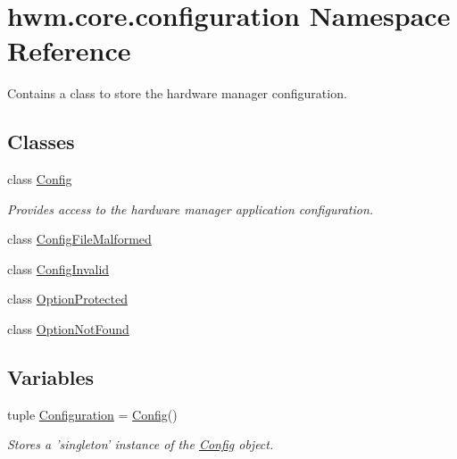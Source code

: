\hypertarget{namespacehwm_1_1core_1_1configuration}{\section{hwm.\-core.\-configuration Namespace Reference}
\label{namespacehwm_1_1core_1_1configuration}
}


Contains a class to store the hardware manager configuration.  


\subsection*{Classes}
\begin{DoxyCompactItemize}
\item 
class \hyperlink{classhwm_1_1core_1_1configuration_1_1_config}{Config}
\begin{DoxyCompactList}\small\item\em Provides access to the hardware manager application configuration. \end{DoxyCompactList}\item 
class \hyperlink{classhwm_1_1core_1_1configuration_1_1_config_file_malformed}{Config\-File\-Malformed}
\item 
class \hyperlink{classhwm_1_1core_1_1configuration_1_1_config_invalid}{Config\-Invalid}
\item 
class \hyperlink{classhwm_1_1core_1_1configuration_1_1_option_protected}{Option\-Protected}
\item 
class \hyperlink{classhwm_1_1core_1_1configuration_1_1_option_not_found}{Option\-Not\-Found}
\end{DoxyCompactItemize}
\subsection*{Variables}
\begin{DoxyCompactItemize}
\item 
tuple \hyperlink{namespacehwm_1_1core_1_1configuration_a87c77155d12f2ea9ccfb44c9602cb86a}{Configuration} = \hyperlink{classhwm_1_1core_1_1configuration_1_1_config}{Config}()
\begin{DoxyCompactList}\small\item\em Stores a 'singleton' instance of the \hyperlink{classhwm_1_1core_1_1configuration_1_1_config}{Config} object. \end{DoxyCompactList}\end{DoxyCompactItemize}



